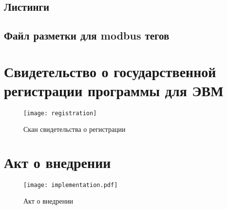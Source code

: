 \begin{landscape}
\chapter{Листинги}
\section{Файл разметки для modbus тегов}

% 

% 
        

\end{landscape}

\chapter{Свидетельство о государственной регистрации программы для ЭВМ}\label{ch:app1}


\begin{center}
    \begin{figure}[hb]
        \texttt{[image: registration]}
        \caption{Скан свидетельства о регистрации}\label{app:fig:registration}
    \end{figure}
\end{center}
    


\chapter{Акт о внедрении}\label{ch:app2}

\begin{center}
    \begin{figure}[hb]
        \texttt{[image: implementation.pdf]}
        \caption{Акт о внедрении}\label{app:fig:implementation}
    \end{figure}
\end{center}